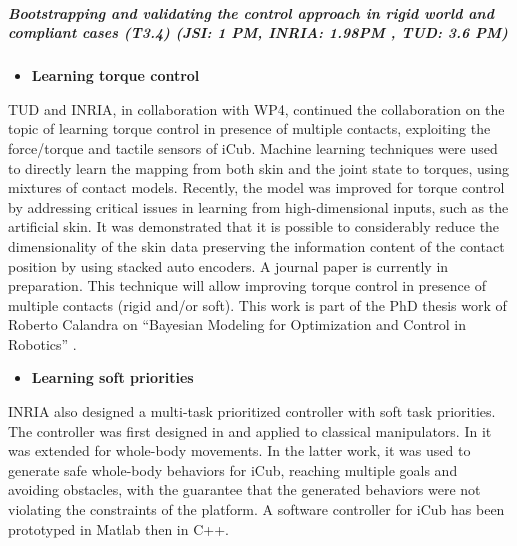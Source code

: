 \subparagraph{Bootstrapping and validating the control approach in rigid world and compliant cases (T3.4) (JSI: 1 PM, INRIA: 1.98PM , TUD: 3.6 PM)}

\begin{itemize}
\item \textbf{Learning torque control}
\end{itemize}
TUD and INRIA, in collaboration with WP4, continued the collaboration on the topic of learning torque control in presence of multiple contacts, exploiting the force/torque and tactile sensors of iCub. Machine learning techniques were used to directly learn the mapping from both skin and the joint state to torques, using mixtures of contact models. Recently, the model was improved for torque control by addressing critical issues in learning from high-dimensional inputs, such as the artificial skin. It was demonstrated that it is possible to considerably reduce the dimensionality of the skin data preserving the information content of the contact position by using stacked auto encoders. A journal paper is currently in preparation. This technique will allow improving torque control in presence of multiple contacts (rigid and/or soft). This work is part of the PhD thesis work of Roberto Calandra on ``Bayesian Modeling for Optimization and Control in Robotics'' \cite{calandra2016PhD}.\\

\begin{itemize}
\item \textbf{Learning soft priorities}
\end{itemize}
INRIA also designed a multi-task prioritized controller with soft task priorities. The controller was first designed in \cite{modugno2016ICRA} and applied to classical manipulators. In \cite{modugno2016Humanoids} it was extended for whole-body movements. In the latter work, it was used to generate safe whole-body behaviors for iCub, reaching multiple goals and avoiding obstacles, with the guarantee that the generated behaviors were not violating the constraints of the platform. A software controller for iCub has been prototyped in Matlab then in C++.

